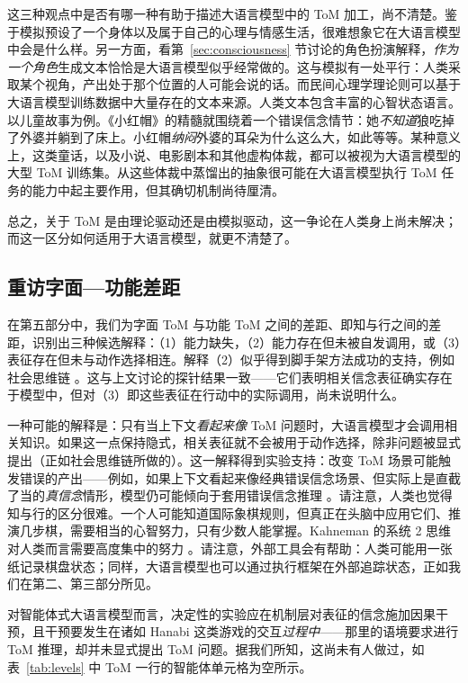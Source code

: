 这三种观点中是否有哪一种有助于描述大语言模型中的 ToM 加工，尚不清楚。鉴于模拟预设了一个身体以及属于自己的心理与情感生活，很难想象它在大语言模型中会是什么样。另一方面，看第~\ref{sec:consciousness} 节讨论的角色扮演解释，\emph{作为一个角色}生成文本恰恰是大语言模型似乎经常做的。这与模拟有一处平行：人类采取某个视角，产出处于那个位置的人可能会说的话。而民间心理学理论则可以基于大语言模型训练数据中大量存在的文本来源。人类文本包含丰富的心智状态语言。以儿童故事为例。《小红帽》的精髓就围绕着一个错误信念情节：她\emph{不知道}狼吃掉了外婆并躺到了床上。小红帽\emph{纳闷}外婆的耳朵为什么这么大，如此等等。某种意义上，这类童话，以及小说、电影剧本和其他虚构体裁，都可以被视为大语言模型的大型 ToM 训练集。从这些体裁中蒸馏出的抽象很可能在大语言模型执行 ToM 任务的能力中起主要作用，但其确切机制尚待厘清。

总之，关于 ToM 是由理论驱动还是由模拟驱动，这一争论在人类身上尚未解决；而这一区分如何适用于大语言模型，就更不清楚了。

\subsection{重访字面—功能差距}
在第五部分中，我们为字面 ToM 与功能 ToM 之间的差距、即知与行之间的差距，识别出三种候选解释：（1）能力缺失，（2）能力存在但未被自发调用，或（3）表征存在但未与动作选择相连。解释（2）似乎得到脚手架方法成功的支持，例如社会思维链 \citep{akata2025playing}。这与上文讨论的探针结果一致——它们表明相关信念表征确实存在于模型中，但对（3）即这些表征在行动中的实际调用，尚未说明什么。

一种可能的解释是：只有当上下文\emph{看起来像} ToM 问题时，大语言模型才会调用相关知识。如果这一点保持隐式，相关表征就不会被用于动作选择，除非问题被显式提出（正如社会思维链所做的）。这一解释得到实验支持：改变 ToM 场景可能触发错误的产出——例如，如果上下文看起来像经典错误信念场景、但实际上是直截了当的\emph{真信念}情形，模型仍可能倾向于套用错误信念推理 \citep{ullman2023large, kouwenhoven2026traces}。请注意，人类也觉得知与行的区分很难。一个人可能知道国际象棋规则，但真正在头脑中应用它们、推演几步棋，需要相当的心智努力，只有少数人能掌握。Kahneman 的系统 2 思维对人类而言需要高度集中的努力 \citep{kahneman2011thinking}。请注意，外部工具会有帮助：人类可能用一张纸记录棋盘状态；同样，大语言模型也可以通过执行框架在外部追踪状态，正如我们在第二、第三部分所见。

对智能体式大语言模型而言，决定性的实验应在机制层对表征的信念施加因果干预，且干预要发生在诸如 Hanabi 这类游戏的交互\emph{过程中}——那里的语境要求进行 ToM 推理，却并未显式提出 ToM 问题。据我们所知，这尚未有人做过，如表~\ref{tab:levels} 中 ToM 一行的智能体单元格为空所示。

